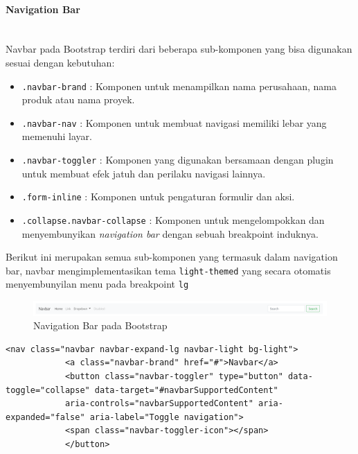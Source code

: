 \documentclass[a4paper,twoside]{article}
\newcommand{\myparagraph}[1]{\paragraph{#1}\mbox{}\\}
\begin{document}
\begin{enumerate}
		\myparagraph{Navigation Bar}
		Navbar pada Bootstrap terdiri dari beberapa sub-komponen yang bisa digunakan sesuai dengan kebutuhan:
		\begin{itemize}
			\item \colorbox{mygray}{\texttt{.navbar-brand}} : Komponen untuk menampilkan nama perusahaan, nama produk atau nama proyek.
			\item \colorbox{mygray}{\texttt{.navbar-nav}} : Komponen untuk membuat navigasi memiliki lebar yang memenuhi layar.
			\item \colorbox{mygray}{\texttt{.navbar-toggler}} : Komponen yang digunakan bersamaan dengan plugin untuk membuat efek jatuh dan perilaku navigasi lainnya.
			\item \colorbox{mygray}{\texttt{.form-inline}} : Komponen untuk pengaturan formulir dan aksi.
			\item \colorbox{mygray}{\texttt{.collapse.navbar-collapse}} : Komponen untuk mengelompokkan dan menyembunyikan \textit{navigation bar} dengan sebuah breakpoint induknya.
		\end{itemize}
		Berikut ini merupakan semua sub-komponen yang termasuk dalam navigation bar, navbar mengimplementasikan tema \colorbox{mygray}{\texttt{light-themed}} yang secara otomatis menyembunyilan menu pada breakpoint \texttt{lg}
		\begin{figure} [H]
			\centering  
			\includegraphics[scale=1.0]{navbar_bootstrap.PNG}  
			\caption{Navigation Bar pada Bootstrap} 
		\end{figure}
		
		\begin{lstlisting}[frame=single, basicstyle=\tiny] 
		<nav class="navbar navbar-expand-lg navbar-light bg-light">
			<a class="navbar-brand" href="#">Navbar</a>
			<button class="navbar-toggler" type="button" data-toggle="collapse" data-target="#navbarSupportedContent" 
			aria-controls="navbarSupportedContent" aria-expanded="false" aria-label="Toggle navigation">
			<span class="navbar-toggler-icon"></span>
			</button>
			

\end{lstlisting}
\end{enumerate}
\end{document}
